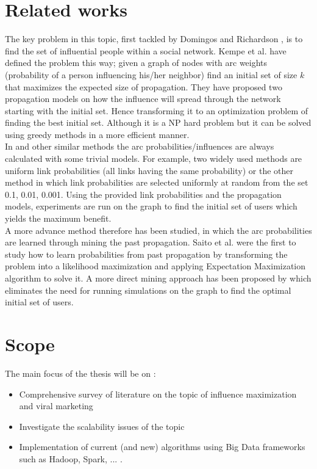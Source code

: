 \documentclass[english]{tktltiki}
\begin{document}
\section{Related works}
The key problem in this topic, first tackled by Domingos and Richardson \cite{domingo01}, is to find the set of influential people within a social network. 
Kempe et al. \cite{kempe03} have defined the problem this way; given a graph of nodes with arc weights (probability of a person influencing his/her neighbor) find an initial set of size $k$ that maximizes the expected size of propagation. They have  proposed two propagation models on how the influence will spread through the network starting with the initial set. Hence transforming it to an optimization problem of finding the best initial set. Although it is a NP hard problem but it can be solved using greedy methods in a more efficient manner. \\
In \cite{kempe03} and other similar methods the arc probabilities/influences are always calculated with some trivial models. For example, two widely used methods are uniform link probabilities (all links having the same probability) or the other method in which link probabilities are selected uniformly at random from the set {0.1, 0.01, 0.001}. Using the provided link probabilities and the propagation models, experiments are run on the graph to find the initial set of users which yields the maximum benefit.  \\
A more advance method therefore has been studied, in which the arc probabilities are learned through mining the past propagation. Saito et al. \cite{saito08} were the first to study how to learn probabilities from past propagation by transforming the problem into a likelihood maximization and applying Expectation Maximization algorithm to solve it. A more direct mining approach has been proposed by \cite{goyal11} which eliminates the need for running simulations on the graph to find the optimal initial set of users. \\


\section{Scope}
The main focus of the thesis will be on :
\begin{itemize}
\item Comprehensive survey of literature on the topic of influence maximization and viral marketing 
\item Investigate the scalability issues of the topic
\item Implementation of current (and new) algorithms using Big Data frameworks  such as Hadoop, Spark, ... .
\end{itemize}
\end{document}
